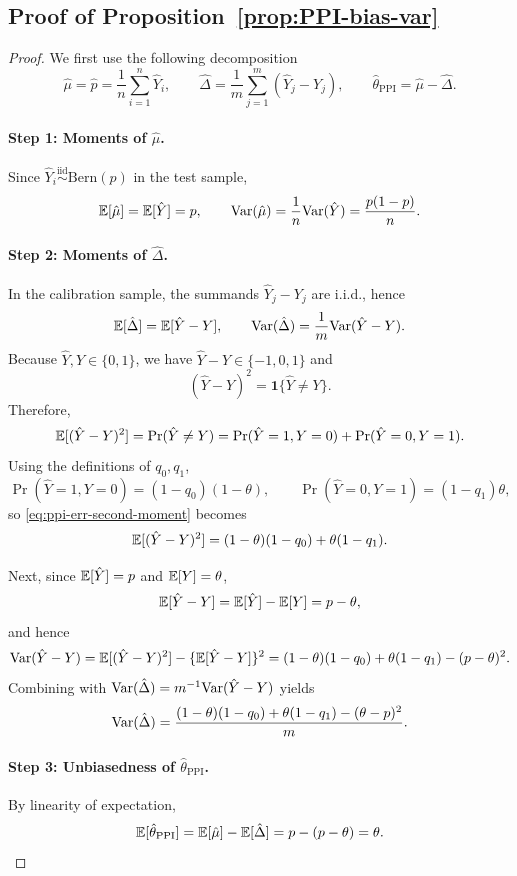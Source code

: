 \subsection{Proof of Proposition~\ref{prop:PPI-bias-var}}
\begin{proof}
We first use the following decomposition
\[
\hat\mu=\hat p=\frac{1}{n}\sum_{i=1}^n \hat Y_i,
\qquad
\hat\Delta=\frac{1}{m}\sum_{j=1}^m (\hat Y_j-Y_j),
\qquad
\hat\theta_{\mathrm{PPI}}=\hat\mu-\hat\Delta.
\]

\paragraph{Step 1: Moments of $\hat\mu$.}
Since $\hat Y_i\stackrel{\mathrm{iid}}{\sim}\mathrm{Bern}(p)$ in the test sample,
\[
\mathbb{E}[\hat\mu]=\mathbb{E}[\hat Y]=p,
\qquad
\mathrm{Var}(\hat\mu)=\frac{1}{n}\mathrm{Var}(\hat Y)=\frac{p(1-p)}{n}.
\]

\paragraph{Step 2: Moments of $\hat\Delta$.}
In the calibration sample, the summands $\hat Y_j-Y_j$ are i.i.d., hence
\[
\mathbb{E}[\hat\Delta]=\mathbb{E}[\hat Y-Y],
\qquad
\mathrm{Var}(\hat\Delta)=\frac{1}{m}\mathrm{Var}(\hat Y-Y).
\]
Because $\hat Y,Y\in\{0,1\}$, we have $\hat Y-Y\in\{-1,0,1\}$ and
\[
(\hat Y-Y)^2=\mathbf 1\{\hat Y\neq Y\}.
\]
Therefore,
\begin{equation}
\mathbb{E}[(\hat Y-Y)^2]=\Pr(\hat Y\neq Y)=\Pr(\hat Y=1,Y=0)+\Pr(\hat Y=0,Y=1).
\label{eq:ppi-err-second-moment}
\end{equation}
Using the definitions of $q_0,q_1$,
\[
\Pr(\hat Y=1,Y=0)=(1-q_0)(1-\theta),
\qquad
\Pr(\hat Y=0,Y=1)=(1-q_1)\theta,
\]
so \eqref{eq:ppi-err-second-moment} becomes
\begin{equation}
\mathbb{E}[(\hat Y-Y)^2]=(1-\theta)(1-q_0)+\theta(1-q_1).
\label{eq:ppi-err-second-moment-explicit}
\end{equation}

Next, since $\mathbb{E}[\hat Y]=p$ and $\mathbb{E}[Y]=\theta$,
\[
\mathbb{E}[\hat Y-Y]=\mathbb{E}[\hat Y]-\mathbb{E}[Y]=p-\theta,
\]
and hence
\begin{equation}
\mathrm{Var}(\hat Y-Y)=\mathbb{E}[(\hat Y-Y)^2]-\{\mathbb{E}[\hat Y-Y]\}^2
=(1-\theta)(1-q_0)+\theta(1-q_1)-(p-\theta)^2.
\label{eq:ppi-err-var-explicit}
\end{equation}
Combining with $\mathrm{Var}(\hat\Delta)=m^{-1}\mathrm{Var}(\hat Y-Y)$ yields
\[
\mathrm{Var}(\hat\Delta)
=
\frac{(1-\theta)(1-q_0)+\theta(1-q_1)-(\theta-p)^2}{m}.
\]

\paragraph{Step 3: Unbiasedness of $\hat\theta_{\mathrm{PPI}}$.}
By linearity of expectation,
\[
\mathbb{E}[\hat\theta_{\mathrm{PPI}}]
=\mathbb{E}[\hat\mu]-\mathbb{E}[\hat\Delta]
= p - (p-\theta)=\theta.
\]


\end{proof}
